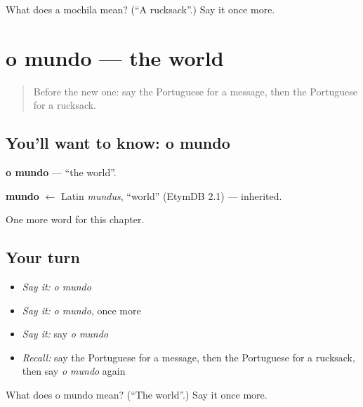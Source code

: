 \begin{tcolorbox}[breakable,colback=teal!4,colframe=teal!35!black,title={Before you move on}]
What does a mochila mean? (\textquotedblleft{}A rucksack\textquotedblright{}.) Say it once more.
\end{tcolorbox}
\section[o mundo]{o mundo — the world}

\label{lesson:PT-C102-mundo}



\begin{quote}
Before the new one: say the Portuguese for a message, then the Portuguese for a rucksack.
\end{quote}

\subsection*{You'll want to know: o mundo}
\textbf{o mundo} — \textquotedblleft{}the world\textquotedblright{}.

\begin{cousinweb}
\textbf{mundo} $\leftarrow$ Latin \emph{mundus}, \textquotedblleft{}world\textquotedblright{} (EtymDB 2.1) — inherited.
\end{cousinweb}

\begin{grammarlens}[title={What you've built}]
One more word for this chapter.
\end{grammarlens}

\subsection*{Your turn}
\begin{itemize}
\raggedright
  \item \emph{Say it:} \emph{o mundo}
  \item \emph{Say it:} \emph{o mundo}, once more
  \item \emph{Say it:} say \emph{o mundo}
  \item \emph{Recall:} say the Portuguese for a message, then the Portuguese for a rucksack, then say \emph{o mundo} again
\end{itemize}

\begin{tcolorbox}[breakable,colback=teal!4,colframe=teal!35!black,title={Before you move on}]
What does o mundo mean? (\textquotedblleft{}The world\textquotedblright{}.) Say it once more.
\end{tcolorbox}
